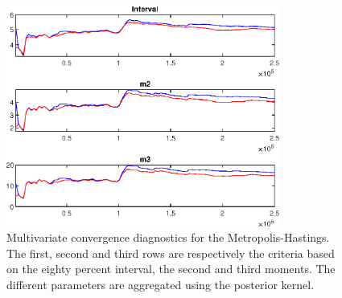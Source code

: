  
\begin{figure}[H]
\centering 
\includegraphics[width=0.8\textwidth]{BRS_util/Output/BRS_util_mdiag}
\caption{Multivariate convergence diagnostics for the Metropolis-Hastings.
The first, second and third rows are respectively the criteria based on
the eighty percent interval, the second and third moments. The different 
parameters are aggregated using the posterior kernel.}\label{Fig:MultivariateDiagnostics}
\end{figure}

